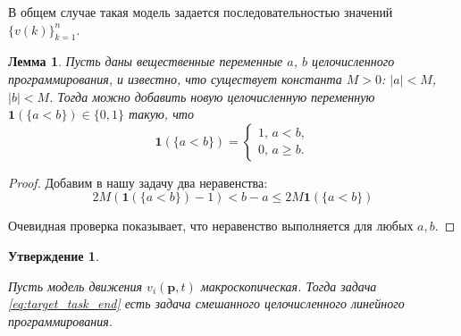 \documentclass[12pt, a4paper]{article}
\newtheorem{state}{Утверждение}[section]
\newtheorem{lemma}{Лемма}[section]
\begin{document}
В общем случае такая модель задается последовательностью значений  $\{v(k)\}_{k = 1}^n$.

\begin{lemma}
	\label{lemma:lt}
	Пусть даны вещественные переменные $a$, $b$ целочисленного программирования, и известно, что существует константа $M > 0$: $|a| < M$, $|b| < M$. Тогда можно добавить новую целочисленную переменную $\textbf{1} (\{a < b\}) \in \{0, 1\}$ такую, что
	\begin{equation*}
		\textbf{1} (\{a < b\}) = 
		\begin{cases}
			1,\, a < b,
			\\
			0,\, a \ge b.
		\end{cases}
	\end{equation*}

\end{lemma}

\begin{proof}
	Добавим в нашу задачу два неравенства:
	$$ 2M (\textbf{1} (\{a < b\}) - 1) < b - a \le 2M\textbf{1} (\{a < b\}) $$
	
	Очевидная проверка показывает, что неравенство выполняется для любых $a, b$.
	
	
\end{proof}

\begin{state}
	
	\label{state:lin_prog}
	
	Пусть модель движения $ v_i(\textbf{p}, t)$ макроскопическая. Тогда задача \eqref{eq:target_task_end} есть задача смешанного целочисленного линейного программирования.
\end{state}
\end{document}
